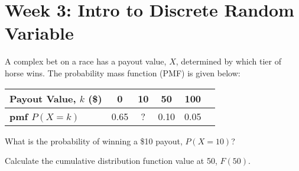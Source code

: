 \documentclass[a4paper, 10pt]{article}
\begin{document}
\subject[2110205 - Statistics for Computer Engineering]


\section{Week 3: Intro to Discrete Random Variable}



\begin{problem}
A complex bet on a race has a payout value, \( X \), determined by which tier
of horse wins. The probability mass function (PMF) is given below:
\par\noindent
\begin{table}[h]
    \centering
    \renewcommand{\arraystretch}{1.5}
    \begin{tabular}{|l|c|c|c|c|c|}
        \hline
        \textbf{Payout Value, \( k \) (\$)} & 0 & 10 & 50 & 100 \\ 
        \hline
        \textbf{pmf \( P(X = k) \)} & 0.65 & ? & 0.10 & 0.05 \\
        \hline
    \end{tabular}
    \label{tab:hw03-pb01}
\end{table}

\begin{subproblems}
    \item What is the probability of winning a \$10 payout, \( P(X = 10) \)?
    \item Calculate the cumulative distribution function value at 50, \( F(50) \).
\end{subproblems}
\end{problem}
\end{document}
